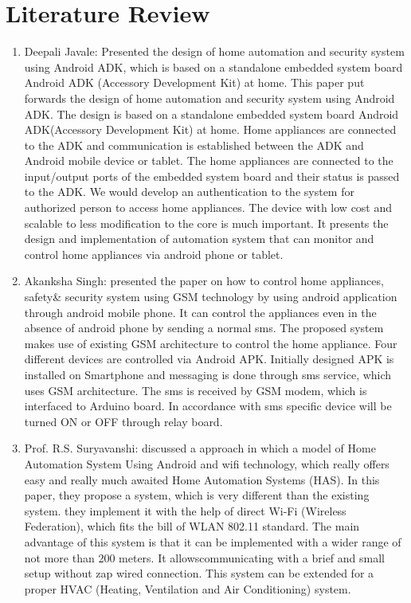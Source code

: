 \chapter{Literature Review}
\thispagestyle{fancy}
\begin{enumerate}
	\item  Deepali Javale: Presented the design of home automation and security system using Android ADK, which is based on a standalone embedded system board Android ADK (Accessory Development Kit) at home. This paper put forwards the design of home automation and security system using Android ADK. The design is based on a standalone embedded system board Android ADK(Accessory Development Kit) at home. Home appliances are connected to the ADK and communication is established between the ADK and Android mobile device or tablet. The home appliances are connected to the input/output ports of the embedded system board and their status is passed to the ADK. We would develop an authentication to the system for authorized person to access home appliances. The device with low cost and scalable to less modification to the core is much important. It presents the design and implementation of automation system that can monitor and control home appliances via android phone or tablet.
	\item  Akanksha Singh: presented the paper on how to control home appliances, safety\& security system using GSM technology by using android application through android mobile phone. It can control the appliances even in the absence of android phone by sending a normal sms. The proposed system makes use of existing GSM architecture to control the home appliance. Four different devices are controlled via Android APK. Initially designed APK is installed on Smartphone and messaging is done through sms service, which uses GSM architecture. The sms is received by GSM modem, which is interfaced to Arduino board. In accordance with sms specific device will be turned ON or OFF through relay board.
	\item Prof. R.S. Suryavanshi: discussed a approach in which a model of Home Automation System Using Android and wifi technology, which really offers easy and really much awaited Home Automation Systems (HAS). In this paper, they propose a system, which is very different than the existing system. they implement it with the help of direct Wi-Fi (Wireless Federation), which fits the bill of WLAN 802.11 standard. The main advantage of this system is that it can be implemented with a wider range of not more than 200 meters. It allowscommunicating with a brief and small setup without zap wired connection. This system can be extended for a proper HVAC (Heating, Ventilation and Air Conditioning) system.

\end{enumerate}
